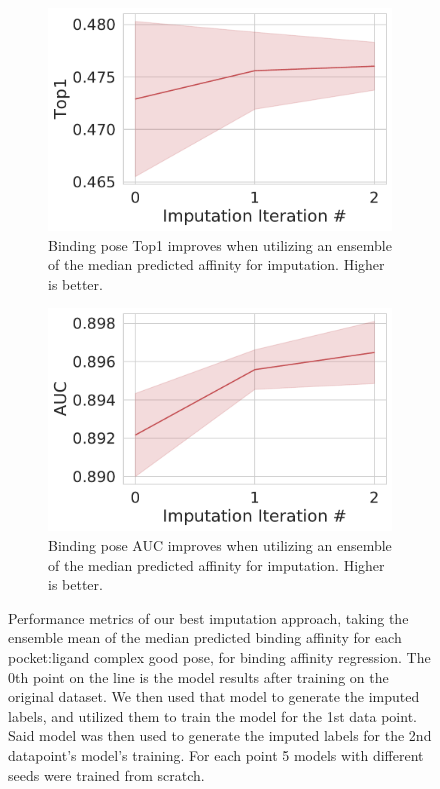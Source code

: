 \documentclass[journal=jmcmar,manuscript=article]{achemso}
\begin{document}
\begin{figure}[tbph]
    \begin{subfigure}[t]{0.48\textwidth}
        \centering
        \includegraphics[width=\linewidth]{figures/MedGOEnsTop1.pdf}
        \caption{Binding pose Top1 improves when utilizing an ensemble of the median predicted affinity for imputation. Higher is better.}
    \end{subfigure}
    \hfill
    \begin{subfigure}[t]{0.48\textwidth}
        \centering
        \includegraphics[width=\linewidth]{figures/MedGOEnsAUC.pdf}
        \caption{Binding pose AUC improves when utilizing an ensemble of the median predicted affinity for imputation. Higher is better.}
    \end{subfigure}
    \caption{Performance metrics of our best imputation approach, taking the ensemble mean of the median predicted binding affinity for each pocket:ligand complex good pose, for binding affinity regression. The 0th point on the line is the model results after training on the original dataset. We then used that model to generate the imputed labels, and utilized them to train the model for the 1st data point. Said model was then used to generate the imputed labels for the 2nd datapoint's model's training. For each point 5 models with different seeds were trained from scratch.}
    \label{fig:medGOEnsOverall}
\end{figure}
\end{document}
